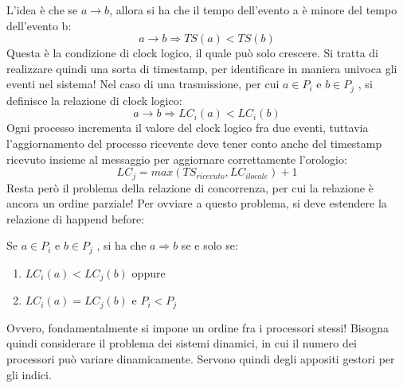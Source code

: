 L'idea è che se $a \rightarrow b$, allora si ha che il tempo dell'evento a è minore del tempo dell'evento b:
\begin{equation}
a \rightarrow b \Rightarrow T S(a) < T S(b)
\end{equation}
Questa è la condizione di clock logico, il quale può solo crescere. Si tratta di realizzare quindi una sorta di
timestamp, per identificare in maniera univoca gli eventi nel sistema!
Nel caso di una trasmissione, per cui $a \in P_i$ e $b \in P_j$ , si definisce la relazione di clock logico:
\begin{equation}
a \rightarrow b \Rightarrow LC_i (a) < LC_i (b)
\end{equation}
Ogni processo incrementa il valore del clock logico fra due eventi, tuttavia l'aggiornamento del processo ricevente
deve tener conto anche del timestamp ricevuto insieme al messaggio per aggiornare correttamente l'orologio:
\begin{equation}
 LC_j = max(TS_{ricevuto} , LC_{i locale}) + 1
\end{equation}
Resta però il problema della relazione di concorrenza, per cui la relazione è ancora un ordine parziale! Per ovviare
a questo problema, si deve estendere la relazione di happend before:

Se $a \in P_i$ e $b \in P_j$ , si ha che $a \Rightarrow b$ se e solo se:
\begin{enumerate}
 \item $LC_i (a) < LC_j (b)$ oppure
 \item $LC_i (a) = LC_j (b)$ e $P_i < P_j$
\end{enumerate}
Ovvero, fondamentalmente si impone un ordine fra i processori stessi! Bisogna quindi considerare il problema dei
sistemi dinamici, in cui il numero dei processori può variare dinamicamente. Servono quindi degli appositi gestori
per gli indici.

